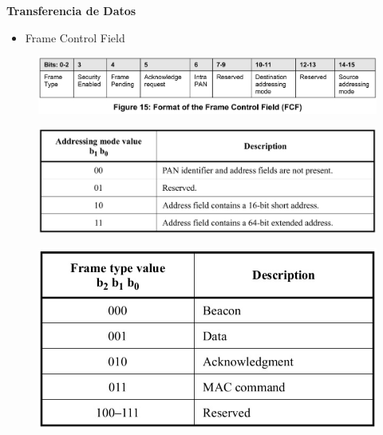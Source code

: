 \documentclass[aspectratio=169]{beamer}
\begin{document}
\begin{frame}{\textbf{Transferencia de Datos}}
\begin{minipage}[c]{1.0\linewidth}
	\begin{minipage}[c]{0.6\linewidth}
		\begin{itemize}
			\item Frame Control Field
			\vspace{10px}
	  	\end{itemize}	
	\end{minipage}
	\begin{minipage}[c]{0.35\linewidth}
		\begin{figure}[H]
			\includegraphics[width=1\textwidth]{./imagenes/FCF.jpg}
		\end{figure}
		\begin{figure}[H]
			\includegraphics[width=1\textwidth]{./imagenes/addressingmode.jpg}
		\end{figure}	
		\begin{figure}[H]
			\includegraphics[width=1\textwidth]{./imagenes/frametype.jpg}
		\end{figure}		  	  	
	\end{minipage}
\end{minipage}
\end{frame}
\end{document}
